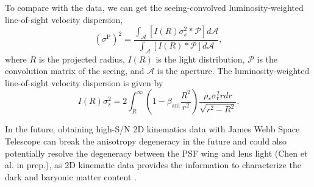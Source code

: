 \documentclass[useAMS,usenatbib]{mnras}
\begin{document}
To compare with the data, we can get the seeing-convolved luminosity-weighted line-of-sight velocity dispersion,
\begin{equation}
    (\sigma^{\textrm{P}})^{2}=\frac{\int_{\mathcal{A}}[I(R)\sigma_{s}^{2}\ast\mathcal{P}]d\mathcal{A}}{\int_{\mathcal{A}}[I(R)\ast\mathcal{P}]d\mathcal{A}},
\end{equation}
where $R$ is the projected radius, $I(R)$ is the light distribution, $\mathcal{P}$ is the convolution matrix of the seeing, and $\mathcal{A}$ is the aperture.
The luminosity-weighted line-of-sight velocity dispersion is given by
\begin{equation}
    I(R)\sigma_{s}^{2}=2\int^{\infty}_{R}(1-\beta_{\textrm{ani}}\frac{R^{2}}{r^{2}})\frac{\rho_{\ast}\sigma^{2}_{\textrm{r}}rdr}{\sqrt{r^{2}-R^{2}}}.
\end{equation}

In the future, obtaining high-S/N 2D kinematics data with James Webb Space Telescope can break the anisotropy degeneracy in the future \citep[][Y{\i}ld{\i}r{\i}m in prep.]{ShajibEtal18} and could also potentially resolve the degeneracy between the PSF wing and lens light (Chen et al. in prep.), as 2D kinematic data provides the information to characterize the dark and baryonic matter content \citep{CappellariEtal13}.
\end{document}
